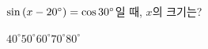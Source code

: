 $\sin\mkern3mu (x-20^\circ)=\cos 30^\circ$일 때, $x$의 크기는? 
\begin{choices32}{$40^\circ$}{$50^\circ$}{$60^\circ$}{$70^\circ$}{$80^\circ$}\end{choices32}
